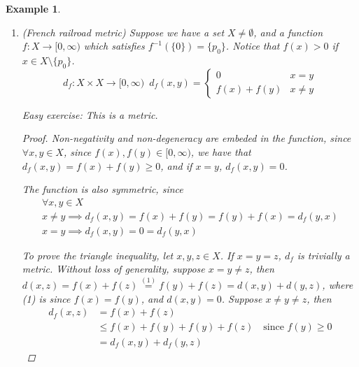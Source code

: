 \documentclass[11pt, oneside]{book}
\theoremstyle{break}
\newtheorem*{proof}{Proof}
\newtheorem{eg}{Example}[section]
\begin{document}
\begin{eg}
\begin{enumerate}
		\item (French railroad metric) Suppose we have a set $X \neq \emptyset$, and a function $f: X \to [0, \infty)$ which satisfies $f^{-1}(\{0\}) = \{p_0\}$. Notice that $f(x) > 0$ if $x \in X \setminus \{p_0\}$.
			\begin{equation}
				d_f: X \times X \to [0, \infty) \enspace d_f (x, y) = 
				\begin{cases}
					0  &  x = y \\
					f(x) + f(y)  &  x \neq y
				\end{cases}
			\end{equation}

			Easy exercise: This is a metric.
			\begin{tcolorbox}
				\begin{proof}
					Non-negativity and non-degeneracy are embeded in the function, since $\forall x, y \in X$, since $f(x), f(y) \in [0, \infty)$, we have that $d_f(x, y) = f(x) + f(y) \geq 0$, and if $x = y$, $d_f(x,y) = 0$.

					The function is also symmetric, since
					\begin{gather*}
						\forall x, y \in X \\
						x \neq y \implies d_f(x, y) = f(x) + f(y) = f(y) + f(x) = d_f(y, x) \\
						x = y \implies d_f(x,y) = 0 = d_f(y, x)
					\end{gather*}

					To prove the triangle inequality, let $x, y, z \in X$. If $x = y = z$, $d_f$ is trivially a metric. Without loss of generality, suppose $x = y \neq z$, then $d(x, z) = f(x) + f(z) \overset{(1)}{=} f(y) + f(z) = d(x,y) + d(y, z)$, where (1) is since $f(x) = f(y)$, and $d(x,y) = 0$. Suppose $x \neq y \neq z$, then
					\begin{align*}
						d_f(x, z) &= f(x) + f(z) \\
							&\leq f(x) + f(y) + f(y) + f(z) \quad \text{since $f(y) \geq 0$} \\
							&= d_f(x, y) + d_f(y, z)
					\end{align*}
				\end{proof}	
			\end{tcolorbox}
	\end{enumerate}
\end{eg}
\end{document}
